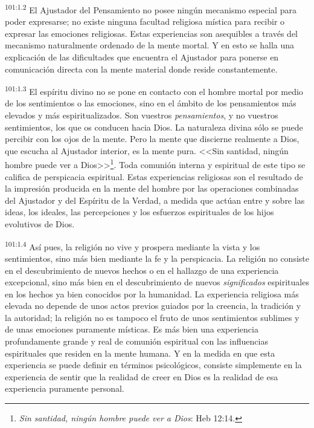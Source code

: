 \documentclass[twoside, 11pt]{book}
\begin{document}
\par
\textsuperscript{101:1.2} El Ajustador del Pensamiento no posee ningún mecanismo especial para poder expresarse; no existe ninguna facultad religiosa mística para recibir o expresar las emociones religiosas. Estas experiencias son asequibles a través del mecanismo naturalmente ordenado de la mente mortal. Y en esto se halla una explicación de las dificultades que encuentra el Ajustador para ponerse en comunicación directa con la mente material donde reside constantemente.

\par
\textsuperscript{101:1.3} El espíritu divino no se pone en contacto con el hombre mortal por medio de los sentimientos o las emociones, sino en el ámbito de los pensamientos más elevados y más espiritualizados. Son vuestros \textit{pensamientos}, y no vuestros sentimientos, los que os conducen hacia Dios. La naturaleza divina sólo se puede percibir con los ojos de la mente. Pero la mente que discierne realmente a Dios, que escucha al Ajustador interior, es la mente pura. <<Sin santidad, ningún hombre puede ver a Dios>>\footnote{\textit{Sin santidad, ningún hombre puede ver a Dios}: Heb 12:14.}. Toda comunión interna y espiritual de este tipo se califica de perspicacia espiritual. Estas experiencias religiosas son el resultado de la impresión producida en la mente del hombre por las operaciones combinadas del Ajustador y del Espíritu de la Verdad, a medida que actúan entre y sobre las ideas, los ideales, las percepciones y los esfuerzos espirituales de los hijos evolutivos de Dios.

\par
\textsuperscript{101:1.4} Así pues, la religión no vive y prospera mediante la vista y los sentimientos, sino más bien mediante la fe y la perspicacia. La religión no consiste en el descubrimiento de nuevos hechos o en el hallazgo de una experiencia excepcional, sino más bien en el descubrimiento de nuevos \textit{significados} espirituales en los hechos ya bien conocidos por la humanidad. La experiencia religiosa más elevada no depende de unos actos previos guiados por la creencia, la tradición y la autoridad; la religión no es tampoco el fruto de unos sentimientos sublimes y de unas emociones puramente místicas. Es más bien una experiencia profundamente grande y real de comunión espiritual con las influencias espirituales que residen en la mente humana. Y en la medida en que esta experiencia se puede definir en términos psicológicos, consiste simplemente en la experiencia de sentir que la realidad de creer en Dios es la realidad de esa experiencia puramente personal.
\end{document}
